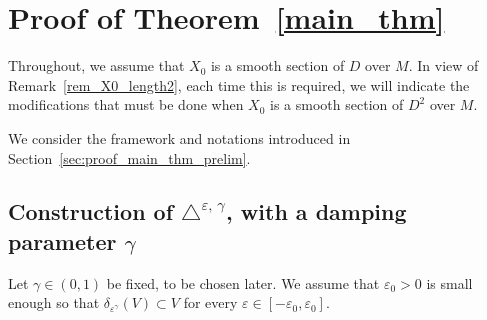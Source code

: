 \documentclass[AHL,Unicode,published]{cedram}
\begin{document}
\pagebreak

\section{Proof of Theorem~\ref{main_thm}}\label{sec:proof_main_thm}

Throughout, we assume that $X_0$ is a smooth section of $D$ over $M$. In view of Remark~\ref{rem_X0_length2}, each time this is required, we will indicate the modifications that must be done when $X_0$ is a smooth section of $D^2$ over $M$.

We consider the framework and notations introduced in Section~\ref{sec:proof_main_thm_prelim}.



\subsection{Construction of \texorpdfstring{$\triangle^{\varepsilon,\,\gamma}$}{triangle varepsilon, gamma}, with a damping parameter \texorpdfstring{$\gamma$}{gamma}}\label{sec_construction_deltaepsiloneta}
Let $\gamma\in(0,1)$ be fixed, to be chosen later. We assume that $\varepsilon_0>0$ is small enough so that $\delta_{\varepsilon^\gamma}(V)\subset V$ for every $\varepsilon\in[-\varepsilon_0,\varepsilon_0]$.
\end{document}
